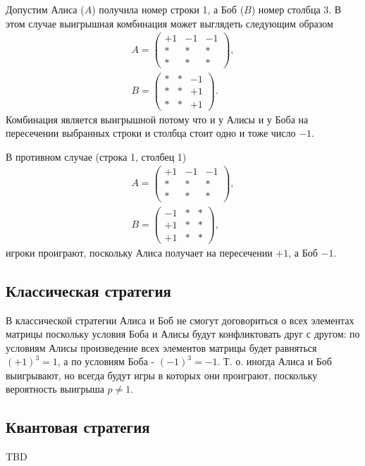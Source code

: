\begin{example}
Допустим Алиса ($A$) получила номер строки 1, а Боб ($B$) номер
столбца 3. В этом случае выигрышная комбинация может выглядеть
следующим образом  
\begin{eqnarray}
A = \left(
\begin{array}{ccc}
+1 & -1 & -1 \\
\ast & \ast & \ast \\
\ast & \ast & \ast  
\end{array}
\right),
\nonumber \\
B = \left(
\begin{array}{ccc}
\ast & \ast & -1 \\
\ast & \ast & +1 \\
\ast & \ast & +1  
\end{array}
\right).
\nonumber 
\end{eqnarray}
Комбинация является выигрышной потому что и у Алисы и у Боба на
пересечении выбранных строки и столбца стоит одно и тоже число $-1$. 


В противном случае (строка 1, столбец 1) 
\begin{eqnarray}
A = \left(
\begin{array}{ccc}
+1 & -1 & -1 \\
\ast & \ast & \ast \\
\ast & \ast & \ast  
\end{array}
\right),
\nonumber \\
B = \left(
\begin{array}{ccc}
-1 & \ast & \ast \\
+1 & \ast & \ast \\
+1 & \ast & \ast  
\end{array}
\right),
\nonumber 
\end{eqnarray}
игроки проиграют, поскольку Алиса получает на пересечении $+1$, а Боб
$-1$. 
\end{example}


\subsection{Классическая стратегия}
В классической стратегии Алиса и Боб не смогут договориться о всех
элементах матрицы поскольку условия Боба и Алисы будут конфликтовать
друг с другом: по условиям Алисы произведение всех элементов матрицы
будет равняться $(+1)^3 = 1$, а по условиям Боба - $(-1)^3 = -1$.
Т. о. иногда Алиса и Боб выигрывают, но всегда будут игры в которых
они проиграют, поскольку вероятность выигрыша $p \ne 1$.

\subsection{Квантовая стратегия}
TBD
